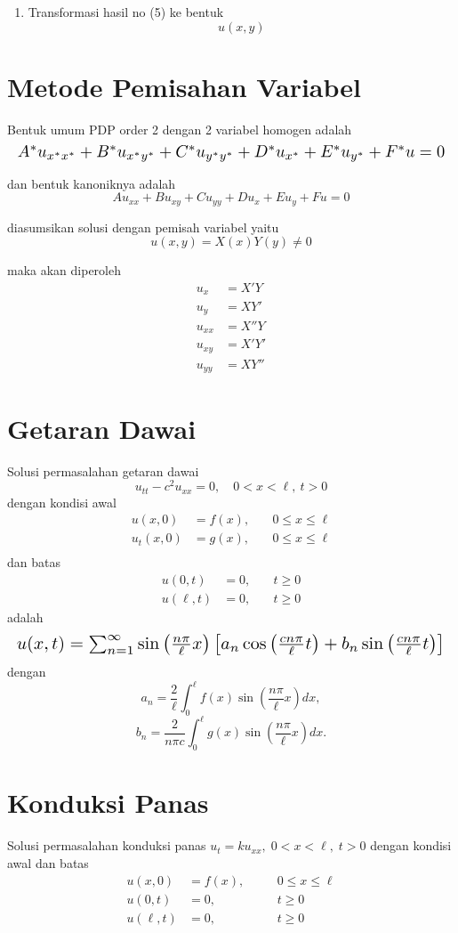 \documentclass[a4paper,extrafontsizes, 9pt]{memoir}
\begin{document}
\begin{multicols}{3}
\begin{enumerate}
    \item Transformasi hasil no (5) ke bentuk
    \[
    u(x, y)
    \]
\end{enumerate}
\section*{\small Metode Pemisahan Variabel}
Bentuk umum PDP order 2 dengan 2 variabel homogen adalah
\[
\resizebox{\linewidth}{!}{$
A^* u_{x^*x^*} + B^* u_{x^*y^*} + C^* u_{y^*y^*} + D^* u_{x^*} + E^* u_{y^*} + F^* u = 0
$}
\]

dan bentuk kanoniknya adalah
\[
A u_{xx} + B u_{xy} + C u_{yy} + D u_x + E u_y + F u = 0
\]

diasumsikan solusi dengan pemisah variabel yaitu
\[
u(x,y) = X(x) Y(y) \ne 0
\]

maka akan diperoleh
\[
\begin{aligned}
u_x &= X' Y \\
u_y &= X Y' \\
u_{xx} &= X'' Y \\
u_{xy} &= X' Y' \\
u_{yy} &= X Y''
\end{aligned}
\]

    \section*{\small Getaran Dawai}
           Solusi permasalahan getaran dawai 
\[
u_{tt} - c^2 u_{xx} = 0, \quad 0 < x < \ell, \ t > 0
\]
dengan kondisi awal 
\[
\begin{aligned}
u(x,0) &= f(x), &\quad 0 \leq x \leq \ell \\
u_t(x,0) &= g(x), &\quad 0 \leq x \leq \ell \\
\end{aligned}
\]
dan batas
\[
\begin{aligned}
u(0,t) &= 0, &\quad t \geq 0 \\
u(\ell,t) &= 0, &\quad t \geq 0
\end{aligned}
\]
adalah
\[
\resizebox{\linewidth}{!}{$
u(x,t) = \sum_{n=1}^{\infty} \sin\left( \frac{n\pi}{\ell} x \right)
\left[ a_n \cos\left( \frac{cn\pi}{\ell} t \right) + b_n \sin\left( \frac{cn\pi}{\ell} t \right) \right]
$}
\]
dengan
\[
a_n = \frac{2}{\ell} \int_0^{\ell} f(x) \sin\left( \frac{n\pi}{\ell} x \right) dx,
\]
\[
b_n = \frac{2}{n\pi c} \int_0^{\ell} g(x) \sin\left( \frac{n\pi}{\ell} x \right) dx.
\]

    \section*{\small Konduksi Panas}
Solusi permasalahan konduksi panas \( u_t = ku_{xx}, \; 0 < x < \ell, \; t > 0 \) dengan kondisi awal dan batas
\[
\begin{aligned}
u(x,0) &= f(x), \quad &&0 \leq x \leq \ell \\
u(0,t) &= 0, \quad &&t \geq 0 \\
u(\ell,t) &= 0, \quad &&t \geq 0
\end{aligned}
\]


\end{multicols}
\end{document}
